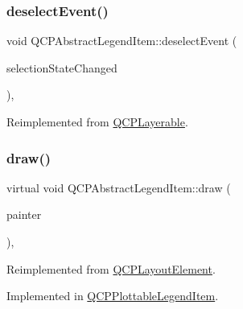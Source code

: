 \mbox{\label{class_q_c_p_abstract_legend_item_aa1c0620558cc8e2a2e6fb7ab558f6097}} 
\subsubsection{\texorpdfstring{deselectEvent()}{deselectEvent()}}
{\footnotesize\ttfamily void Q\+C\+P\+Abstract\+Legend\+Item\+::deselect\+Event (\begin{DoxyParamCaption}\item[{bool $\ast$}]{selection\+State\+Changed }\end{DoxyParamCaption})\hspace{0.3cm}{\ttfamily [protected]}, {\ttfamily [virtual]}}



Reimplemented from \mbox{\hyperlink{class_q_c_p_layerable_ae546370644a5551c76af739afc008bee}{Q\+C\+P\+Layerable}}.

\mbox{\label{class_q_c_p_abstract_legend_item_a14ce0b09f5b814c765a0d790bd838909}} 
\subsubsection{\texorpdfstring{draw()}{draw()}}
{\footnotesize\ttfamily virtual void Q\+C\+P\+Abstract\+Legend\+Item\+::draw (\begin{DoxyParamCaption}\item[{\mbox{\hyperlink{class_q_c_p_painter}{Q\+C\+P\+Painter}} $\ast$}]{painter }\end{DoxyParamCaption})\hspace{0.3cm}{\ttfamily [protected]}, {}}



Reimplemented from \mbox{\hyperlink{class_q_c_p_layout_element_ad1c597b1d608cfdd86e7b76819a94cfb}{Q\+C\+P\+Layout\+Element}}.



Implemented in \mbox{\hyperlink{class_q_c_p_plottable_legend_item_a5838366619200e99680afa6d355d13fa}{Q\+C\+P\+Plottable\+Legend\+Item}}.

